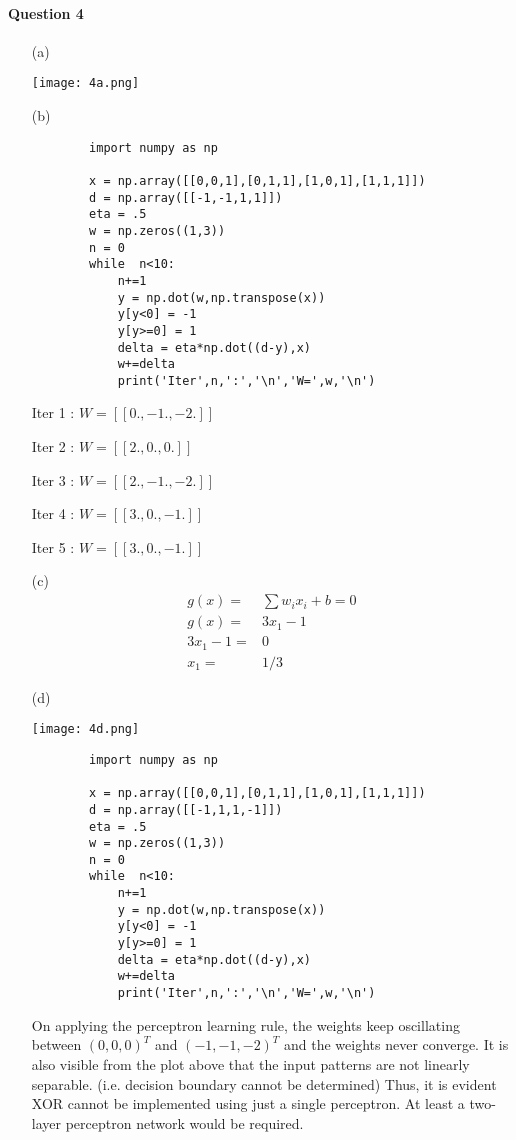 \documentclass[12pt]{article}
\begin{document}
\paragraph{Question 4}
\begin{itemize}
    \item[(a)]
    \begin{center}
        \texttt{[image: 4a.png]}
    \end{center}
    \item[(b)] 
    \begin{lstlisting}
        import numpy as np
        
        x = np.array([[0,0,1],[0,1,1],[1,0,1],[1,1,1]])
        d = np.array([[-1,-1,1,1]])
        eta = .5
        w = np.zeros((1,3))
        n = 0
        while  n<10:
        	n+=1
        	y = np.dot(w,np.transpose(x))
        	y[y<0] = -1
        	y[y>=0] = 1
        	delta = eta*np.dot((d-y),x)
        	w+=delta
        	print('Iter',n,':','\n','W=',w,'\n')
    \end{lstlisting}
    Iter 1 : 
    $W= [[ 0., -1. ,-2.]]$
    
    Iter 2 : 
    $W= [[ 2. , 0.,  0.]]$
    
    Iter 3 : 
    $W= [[ 2., -1. ,-2.]]$ 
    
    Iter 4 : 
    $W= [[ 3.,  0., -1.]]$ 

    Iter 5 : 
    $W= [[ 3.,  0. ,-1.]]$ 
    
    \item[(c)]
    \begin{align*}
        g(x) = & \sum w_i x_i + b = 0 \\
        g(x)= & 3x_1 - 1 \\
        3x_1 - 1 = & 0 \\
        x_1 = & 1/3
    \end{align*}
    \item[(d)]
    \begin{center}
        \texttt{[image: 4d.png]}
    \end{center}
    \begin{lstlisting}
        import numpy as np
        
        x = np.array([[0,0,1],[0,1,1],[1,0,1],[1,1,1]])
        d = np.array([[-1,1,1,-1]])
        eta = .5
        w = np.zeros((1,3))
        n = 0
        while  n<10:
        	n+=1
        	y = np.dot(w,np.transpose(x))
        	y[y<0] = -1
        	y[y>=0] = 1
        	delta = eta*np.dot((d-y),x)
        	w+=delta
        	print('Iter',n,':','\n','W=',w,'\n')
    \end{lstlisting}
    On applying the perceptron learning rule, the weights keep oscillating between $(0,0,0)^T$ and $(-1,-1,-2)^T$ and the weights never converge. 
    It is also visible from the plot above that the input patterns are not linearly separable. (i.e. decision boundary cannot be determined) 
    Thus, it is evident XOR cannot be implemented using just a single perceptron. At least a two-layer perceptron network would be required. 
\end{itemize}
\end{document}
